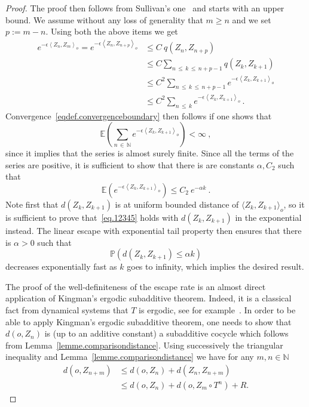 \documentclass[AHL,Unicode,longabstracts,published]{cedram}
\newcommand{\EE}{\mathbb{E}}
\newcommand{\PP}{\mathbb{P}}
\newcommand{\NN}{\mathbb{N}}
\newcommand{\somme}[1]{\underset{#1}{\sum}}
\begin{document}
\begin{proof}
The proof then follows from Sullivan's one~\cite{sullivanconvergenceboundary} and starts with an upper bound. We assume without any loss of generality that $m \ge n$ and we set $p := m -n$. Using both the above items we get
\begin{align}
e^{ - \epsilon \left\langle Z_n, Z_{m} \right\rangle_o} = e^{ - \epsilon \left\langle Z_n, Z_{n+p} \right\rangle_o} & \le C \ q\left(Z_n, Z_{n+p}\right) \\
& \le C \somme{n\,\le\,k\,\le\,n+p-1} q\left(Z_k, Z_{k+1}\right) \\
& \le C^2 \somme{n\,\le\,k\,\le\,n+p -1} e^{ - \epsilon\left\langle Z_k, Z_{k+1}\right\rangle_o} \\
& \le C^2 \somme{n\,\le\,k} e^{ - \epsilon \left\langle Z_k, Z_{k+1}\right\rangle_o} \, .
\end{align}
Convergence~\eqref{eqdef.convergenceboundary} then follows if one shows that
\begin{equation}\label{eq.convergencetotheboundnary}
\EE \left(\somme{n\,\in\,\NN} e^{ - \epsilon \left\langle Z_k, Z_{k+1}\right\rangle_o} \right) < \infty \ ,
\end{equation}
since it implies that the series is almost surely finite. Since all the terms of the series are positive, it is sufficient to show that there is are constants $\alpha, C_2$ such that
\begin{equation}\label{eq.12345}
\EE \left(e^{ - \epsilon \left\langle Z_k, Z_{k+1} \right\rangle_o} \right) \le C_2 \ e^{- \alpha k} \ .
\end{equation}
Note first that $d(Z_k, Z_{k+1})$ is at uniform bounded distance of $\langle Z_k, Z_{k+1} \rangle_o$, so it is sufficient to prove that~\eqref{eq.12345} holds with $d(Z_k, Z_{k+1})$ in the exponential instead. The linear escape with exponential tail property then ensures that there is $\alpha > 0$ such that
\[
\PP \left(d\left(Z_k, Z_{k+1}\right) \le \alpha k \right)
\]
decreases exponentially fast as $k$ goes to infinity, which implies the desired result. 

The proof of the well-definiteness of the escape rate is an almost direct application of Kingman's ergodic subadditive theorem. Indeed, it is a classical fact from dynamical systems that $T$ is ergodic, see for example~\cite[Proposition~3.2]{coudi}. In order to be able to apply Kingman's ergodic subadditive theorem, one needs to show that $d(o,Z_n)$ is (up to an additive constant) a subadditive cocycle which follows from Lemma~\ref{lemme.comparisondistance}. Using successively the triangular inequality and Lemma~\ref{lemme.comparisondistance} we have for any $m,n \in \NN$
\begin{align*}
d\left(o,Z_{n +m}\right) & \le d\left(o,Z_{n}\right) + d\left(Z_n,Z_{n+m}\right) \\
& \le d\left(o,Z_{n}\right) + d\left(o,Z_{m} \circ T^n\right) + R  .
\end{align*}


\end{proof}
\end{document}
